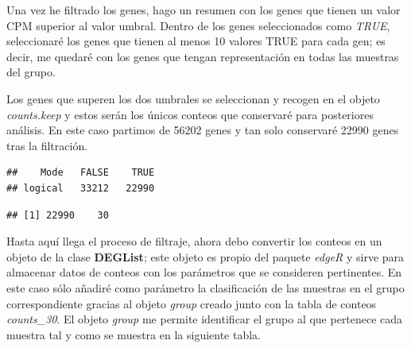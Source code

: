 \documentclass[]{article}
\newenvironment{Shaded}{\begin{snugshade}}{\end{snugshade}}
\newcommand{\DataTypeTok}[1]{\textcolor[rgb]{0.13,0.29,0.53}{#1}}
\newcommand{\KeywordTok}[1]{\textcolor[rgb]{0.13,0.29,0.53}{\textbf{#1}}}
\newcommand{\NormalTok}[1]{#1}
\newcommand{\OperatorTok}[1]{\textcolor[rgb]{0.81,0.36,0.00}{\textbf{#1}}}
\newcommand{\OtherTok}[1]{\textcolor[rgb]{0.56,0.35,0.01}{#1}}
\newcommand{\StringTok}[1]{\textcolor[rgb]{0.31,0.60,0.02}{#1}}
\begin{document}
Una vez he filtrado los genes, hago un resumen con los genes que tienen
un valor CPM superior al valor umbral. Dentro de los genes seleccionados
como \emph{TRUE}, seleccionaré los genes que tienen al menos 10 valores
TRUE para cada gen; es decir, me quedaré con los genes que tengan
representación en todas las muestras del grupo.

Los genes que superen los dos umbrales se seleccionan y recogen en el
objeto \emph{counts.keep} y estos serán los únicos conteos que
conservaré para posteriores análisis. En este caso partimos de 56202
genes y tan solo conservaré 22990 genes tras la filtración.

\begin{verbatim}
##    Mode   FALSE    TRUE 
## logical   33212   22990
\end{verbatim}

\begin{verbatim}
## [1] 22990    30
\end{verbatim}

Hasta aquí llega el proceso de filtraje, ahora debo convertir los
conteos en un objeto de la clase \textbf{DEGList}; este objeto es propio
del paquete \emph{edgeR} y sirve para almacenar datos de conteos con los
parámetros que se consideren pertinentes. En este caso sólo añadiré como
parámetro la clasificación de las muestras en el grupo correspondiente
gracias al objeto \emph{group} creado junto con la tabla de conteos
\emph{counts\_30}. El objeto \emph{group} me permite identificar el
grupo al que pertenece cada muestra tal y como se muestra en la
siguiente tabla.

\begin{Shaded}
\end{Shaded}
\end{document}
